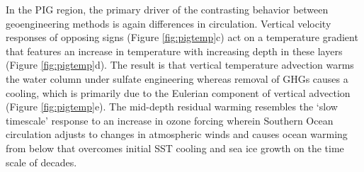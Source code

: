 \documentclass{nature}
\begin{document}
In the PIG region, the primary driver of the contrasting behavior between geoengineering methods is again differences in circulation. Vertical velocity responses of opposing signs (Figure \ref{fig:pigtemp}c) act on a temperature gradient that features an increase in temperature with increasing depth in these layers (Figure \ref{fig:pigtemp}d). The result is that vertical temperature advection warms the water column under sulfate engineering whereas removal of GHGs causes a cooling, which is primarily due to the Eulerian component of vertical advection (Figure \ref{fig:pigtemp}e). The mid-depth residual warming resembles the `slow timescale' response to an increase in ozone forcing wherein Southern Ocean circulation adjusts to changes in atmospheric winds and causes ocean warming from below that overcomes initial SST cooling and sea ice growth on the time scale of decades. %
\end{document}
